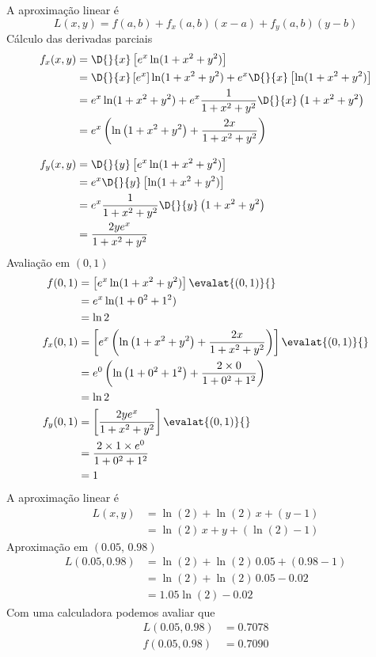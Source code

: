 \documentclass[a4paper,12pt,fleqn]{article}
\begin{document}
\begin{answer}
A aproximação linear é
\[
  L(x, y) = f(a, b) + f_x(a, b) (x-a) + f_y(a, b) (y-b)
\]
Cálculo das derivadas parciais
\begin{align*}
  f_x(x, y)
  & = \D{}{x} \left[e^{x}\ln(1+x^{2}+y^{2})\right] \\
  & = \D{}{x} \left[e^{x}\right]\ln(1+x^{2}+y^{2})
    + e^{x}\D{}{x} \left[\ln(1+x^{2}+y^{2})\right] \\
  & = e^{x}\ln(1+x^{2}+y^{2})
    + e^{x} \frac{1}{1+x^{2}+y^{2}} \D{}{x} \left(1+x^{2}+y^{2}\right)\\
  & = e^x\left(\ln\left(1+x^2+y^2\right) + \frac{2x}{1+x^2+y^2}\right)
  \\[3mm]
  f_y(x,y)
  & = \D{}{y} \left[e^{x}\ln(1+x^{2}+y^{2})\right] \\
  & = e^{x}\D{}{y} \left[\ln(1+x^{2}+y^{2})\right] \\
  & = e^{x} \frac{1}{1+x^{2}+y^{2}} \D{}{y} \left(1+x^{2}+y^{2}\right)\\
  & = \frac{2ye^x}{1+x^2+y^2}
\end{align*}
Avaliação em \((0, 1)\)
\begin{align*}
  f(0, 1)
  & = \left[e^{x}\ln(1+x^{2}+y^{2})\right] \evalat{(0, 1)}{} \\
  & = e^{x}\ln(1+0^{2}+1^{2}) \\
  & = \ln 2 \\
  f_x(0, 1)
  & = \left[e^x\left(\ln\left(1+x^2+y^2\right) + \frac{2x}{1+x^2+y^2}\right)\right] \evalat{(0, 1)}{} \\
  & = e^0\left(\ln\left(1+0^2+1^2\right) + \frac{2\times 0}{1+0^2+1^2}\right) \\
  & = \ln 2 \\
  f_y(0, 1)
  & = \left[\frac{2ye^x}{1+x^2+y^2}\right] \evalat{(0, 1)}{} \\
  & = \frac{2\times 1 \times e^0}{1+0^2+1^2} \\
  & = 1
\end{align*}
A aproximação linear é
\begin{align*}
  L(x, y)
  & = \ln(2)    + \ln(2)\,x + (y-1) \\
  & = \ln(2)\,x + y + (\ln(2) -1)
\end{align*}
Aproximação em \((0.05,\,0.98)\)
\begin{align*}
  L(0.05, 0.98)
  & = \ln(2) + \ln(2)\,0.05 + (0.98-1) \\
  & = \ln(2) + \ln(2)\,0.05 - 0.02 \\
  & = 1.05\ln(2) - 0.02
\end{align*}
Com uma calculadora podemos avaliar que
\begin{align*}
  L(0.05, 0.98) & = 0.7078 \\
  f(0.05, 0.98) & = 0.7090
\end{align*}
\end{answer}

\end{document}
